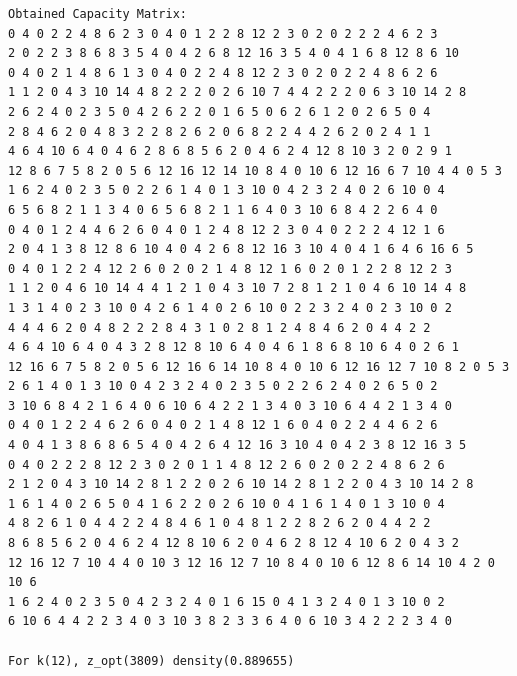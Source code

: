 \documentclass[11pt]{article}
\begin{document}
\begin{lstlisting}
Obtained Capacity Matrix:
0 4 0 2 2 4 8 6 2 3 0 4 0 1 2 2 8 12 2 3 0 2 0 2 2 2 4 6 2 3
2 0 2 2 3 8 6 8 3 5 4 0 4 2 6 8 12 16 3 5 4 0 4 1 6 8 12 8 6 10
0 4 0 2 1 4 8 6 1 3 0 4 0 2 2 4 8 12 2 3 0 2 0 2 2 4 8 6 2 6
1 1 2 0 4 3 10 14 4 8 2 2 2 0 2 6 10 7 4 4 2 2 2 0 6 3 10 14 2 8
2 6 2 4 0 2 3 5 0 4 2 6 2 2 0 1 6 5 0 6 2 6 1 2 0 2 6 5 0 4
2 8 4 6 2 0 4 8 3 2 2 8 2 6 2 0 6 8 2 2 4 4 2 6 2 0 2 4 1 1
4 6 4 10 6 4 0 4 6 2 8 6 8 5 6 2 0 4 6 2 4 12 8 10 3 2 0 2 9 1
12 8 6 7 5 8 2 0 5 6 12 16 12 14 10 8 4 0 10 6 12 16 6 7 10 4 4 0 5 3
1 6 2 4 0 2 3 5 0 2 2 6 1 4 0 1 3 10 0 4 2 3 2 4 0 2 6 10 0 4
6 5 6 8 2 1 1 3 4 0 6 5 6 8 2 1 1 6 4 0 3 10 6 8 4 2 2 6 4 0
0 4 0 1 2 4 4 6 2 6 0 4 0 1 2 4 8 12 2 3 0 4 0 2 2 2 4 12 1 6
2 0 4 1 3 8 12 8 6 10 4 0 4 2 6 8 12 16 3 10 4 0 4 1 6 4 6 16 6 5
0 4 0 1 2 2 4 12 2 6 0 2 0 2 1 4 8 12 1 6 0 2 0 1 2 2 8 12 2 3
1 1 2 0 4 6 10 14 4 4 1 2 1 0 4 3 10 7 2 8 1 2 1 0 4 6 10 14 4 8
1 3 1 4 0 2 3 10 0 4 2 6 1 4 0 2 6 10 0 2 2 3 2 4 0 2 3 10 0 2
4 4 4 6 2 0 4 8 2 2 2 8 4 3 1 0 2 8 1 2 4 8 4 6 2 0 4 4 2 2
4 6 4 10 6 4 0 4 3 2 8 12 8 10 6 4 0 4 6 1 8 6 8 10 6 4 0 2 6 1
12 16 6 7 5 8 2 0 5 6 12 16 6 14 10 8 4 0 10 6 12 16 12 7 10 8 2 0 5 3
2 6 1 4 0 1 3 10 0 4 2 3 2 4 0 2 3 5 0 2 2 6 2 4 0 2 6 5 0 2
3 10 6 8 4 2 1 6 4 0 6 10 6 4 2 2 1 3 4 0 3 10 6 4 4 2 1 3 4 0
0 4 0 1 2 2 4 6 2 6 0 4 0 2 1 4 8 12 1 6 0 4 0 2 2 4 4 6 2 6
4 0 4 1 3 8 6 8 6 5 4 0 4 2 6 4 12 16 3 10 4 0 4 2 3 8 12 16 3 5
0 4 0 2 2 2 8 12 2 3 0 2 0 1 1 4 8 12 2 6 0 2 0 2 2 4 8 6 2 6
2 1 2 0 4 3 10 14 2 8 1 2 2 0 2 6 10 14 2 8 1 2 2 0 4 3 10 14 2 8
1 6 1 4 0 2 6 5 0 4 1 6 2 2 0 2 6 10 0 4 1 6 1 4 0 1 3 10 0 4
4 8 2 6 1 0 4 4 2 2 4 8 4 6 1 0 4 8 1 2 2 8 2 6 2 0 4 4 2 2
8 6 8 5 6 2 0 4 6 2 4 12 8 10 6 2 0 4 6 2 8 12 4 10 6 2 0 4 3 2
12 16 12 7 10 4 4 0 10 3 12 16 12 7 10 8 4 0 10 6 12 8 6 14 10 4 2 0 10 6
1 6 2 4 0 2 3 5 0 4 2 3 2 4 0 1 6 15 0 4 1 3 2 4 0 1 3 10 0 2
6 10 6 4 4 2 2 3 4 0 3 10 3 8 2 3 3 6 4 0 6 10 3 4 2 2 2 3 4 0

For k(12), z_opt(3809) density(0.889655)


\end{lstlisting}
\end{document}
